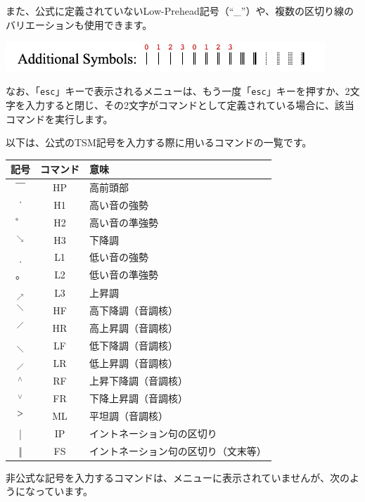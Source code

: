 また、公式に定義されていないLow-Prehead記号（``\_''）や、複数の区切り線のバリエーションも使用できます。

\begin{center}
	\includegraphics[width=12cm]{additionalSymbols.jpeg}
 \end{center}


なお、「\texttt{esc}」キーで表示されるメニューは、もう一度「\texttt{esc}」キーを押すか、2文字を入力すると閉じ、その2文字がコマンドとして定義されている場合に、該当コマンドを実行します。

以下は、公式のTSM記号を入力する際に用いるコマンドの一覧です。

\renewcommand{\arraystretch}{1.2}
\begin{table}[h]
	\centering
	\begin{tabular}{ccl}
	\hline
	記号 & コマンド & 意味\\
	\hline
	\hline
	￣ & HP & 高前頭部\\
	\hline
	ˈ & H1 & 高い音の強勢\\
	\hline
	゜ & H2 & 高い音の準強勢\\
	\hline
	\tiny{$^↘$} & H3 & 下降調\\
	\hline
	ˌ & L1 & 低い音の強勢\\
	\hline
	。 & L2 & 低い音の準強勢\\
	\hline
	\tiny{$_↗$} & L3 & 上昇調\\
	\hline
	\hline
	$^＼$ & HF & 高下降調（音調核）\\
	\hline
	$^／$ & HR & 高上昇調（音調核）\\
	\hline
	$_＼$ & LF & 低下降調（音調核）\\
	\hline
	$_／$ & LR & 低上昇調（音調核）\\
	\hline
	$^∧$  & RF & 上昇下降調（音調核）\\
	\hline
	$^∨$ & FR & 下降上昇調（音調核）\\
	\hline
	$^＞$ & ML & 平坦調（音調核）\\
	\hline
	\hline
	| & IP & イントネーション句の区切り\\
	\hline
	‖ & FS & イントネーション句の区切り（文末等）\\
	\hline
	\end{tabular}
\end{table}

非公式な記号を入力するコマンドは、メニューに表示されていませんが、次のようになっています。

